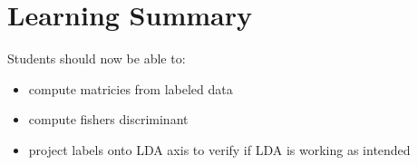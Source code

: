 \documentclass[12pt]{book}
\begin{document}
\section*{Learning Summary}
Students should now be able to:
\begin{itemize}
        \item compute matricies from labeled data
        \item compute fishers discriminant
        \item project labels onto LDA axis to verify if LDA is working as intended
\end{itemize}
\end{document}
